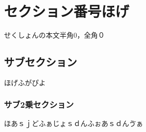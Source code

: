 \documentclass[10pt, a4j, uplatex, twocolumn]{jsarticle}
\begin{document}


\section{セクション番号ほげ}
せくしょんの本文半角0，全角０
\subsection{サブセクション}
ほげふがぴよ

\subsubsection{サブ2乗セクション}
ほあｓｊどふぁじょｓｄんふぉあｓｄんゔぁ
\end{document}
